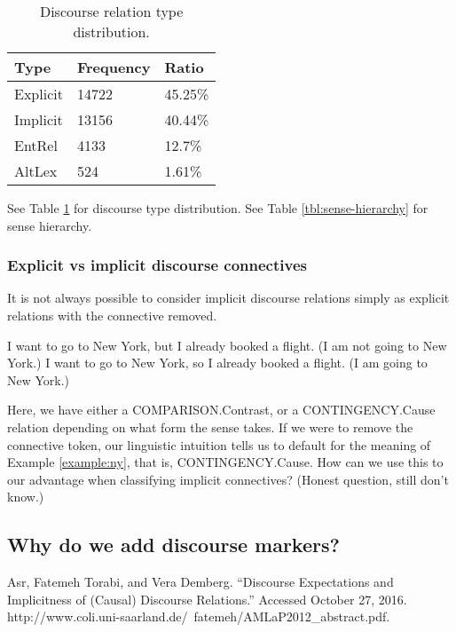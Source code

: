 \begin{table}[t]
\centering
\begin{tabular}{@{}lll@{}}
\toprule
Type     & Frequency & Ratio \\ \midrule
Explicit & 14722 & 45.25\%    \\
Implicit & 13156 & 40.44\%    \\
EntRel   & 4133  & 12.7\%     \\
AltLex   & 524   & 1.61\%     \\ \bottomrule
\end{tabular}
\caption{Discourse relation type distribution.}
\label{tbl:discourse-relation-type-distribution}
\end{table}
See Table \ref{tbl:discourse-relation-type-distribution} for discourse type distribution. See Table \ref{tbl:sense-hierarchy} for sense hierarchy.

\subsubsection{Explicit vs implicit discourse connectives} \label{sec:implexpl}



It is not always possible to consider implicit discourse relations simply as explicit relations with the connective removed.

\begin{exe}
\ex I want to go to New York, but I already booked a flight. (I am not going to New York.)\label{example:notny}
\ex I want to go to New York, so I already booked a flight. (I am going to New York.)\label{example:ny}
\end{exe}

Here, we have either a COMPARISON.Contrast, or a CONTINGENCY.Cause relation depending on what form the sense takes. If we were to remove the connective token, our linguistic intuition tells us to default for the meaning of Example \ref{example:ny}, that is, CONTINGENCY.Cause. How can we use this to our advantage when classifying implicit connectives? (Honest question, still don't know.)

\subsection{Why do we add discourse markers?}

Asr, Fatemeh Torabi, and Vera Demberg. “Discourse Expectations and Implicitness of (Causal) Discourse Relations.” Accessed October 27, 2016. http://www.coli.uni-saarland.de/~fatemeh/AMLaP2012_abstract.pdf.




